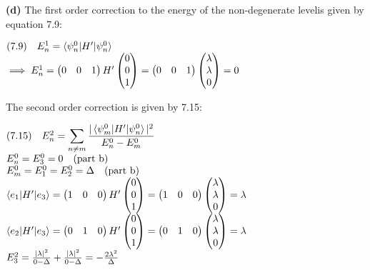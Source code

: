 \documentclass[14pt]{extarticle}
\makeatletter
\newenvironment{lefteqs}{%
    \begin{flushleft}%
    \renewcommand{\arraystretch}{1.3}%
    $\begin{array}{@{}l@{}}%
}{%
    \end{array}$%
    \end{flushleft}%
}
\makeatother
\begin{document}
\textbf{(d)}
The first order correction to the energy of the non-degenerate levelis given by equation 7.9:
\begin{lefteqs}
    \text{(7.9)} \quad E^1_n = \braket{\psi^0_n | H' | \psi^0_n} \\
    \implies E^1_n = \begin{pmatrix}0 & 0 & 1\end{pmatrix} H' \begin{pmatrix}0 \\ 0 \\ 1\end{pmatrix} = \begin{pmatrix}0 & 0 & 1\end{pmatrix} \begin{pmatrix} \lambda \\ \lambda \\ 0 \end{pmatrix} = 0
\end{lefteqs}

The second order correction is given by 7.15:

\begin{lefteqs}
    \text{(7.15)} \quad E^2_n = \displaystyle \sum_{n \neq m} \frac{|\braket{\psi^0_m | H' | \psi^0_n}|^2}{E^0_n - E^0_m} \\
    E^0_n = E^0_3 = 0 \quad \text{(part b)} \\
    E^0_m = E^0_1 = E^0_2 = \Delta \quad \text{(part b)} \\
    \braket{e_1 | H' | e_3} = \begin{pmatrix}1 & 0 & 0\end{pmatrix} H' \begin{pmatrix}0 \\ 0 \\ 1\end{pmatrix} = \begin{pmatrix}1 & 0 & 0\end{pmatrix} \begin{pmatrix} \lambda \\ \lambda \\ 0 \end{pmatrix} = \lambda \\
    \braket{e_2 | H' | e_3} = \begin{pmatrix}0 & 1 & 0\end{pmatrix} H' \begin{pmatrix}0 \\ 0 \\ 1\end{pmatrix} = \begin{pmatrix}0 & 1 & 0\end{pmatrix} \begin{pmatrix} \lambda \\ \lambda \\ 0 \end{pmatrix} = \lambda \\
    E^2_3 = \frac{|\lambda|^2}{0 - \Delta} + \frac{|\lambda|^2}{0 - \Delta} = -\frac{2\lambda^2}{\Delta}
\end{lefteqs}
\end{document}
